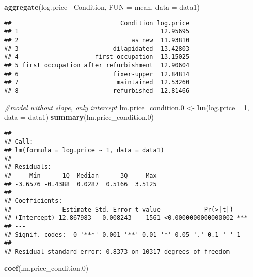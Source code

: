 \documentclass[
]{article}
\newenvironment{Shaded}{\begin{snugshade}}{\end{snugshade}}
\newcommand{\CommentTok}[1]{\textcolor[rgb]{0.56,0.35,0.01}{\textit{#1}}}
\newcommand{\DataTypeTok}[1]{\textcolor[rgb]{0.13,0.29,0.53}{#1}}
\newcommand{\DecValTok}[1]{\textcolor[rgb]{0.00,0.00,0.81}{#1}}
\newcommand{\FloatTok}[1]{\textcolor[rgb]{0.00,0.00,0.81}{#1}}
\newcommand{\KeywordTok}[1]{\textcolor[rgb]{0.13,0.29,0.53}{\textbf{#1}}}
\newcommand{\NormalTok}[1]{#1}
\newcommand{\OperatorTok}[1]{\textcolor[rgb]{0.81,0.36,0.00}{\textbf{#1}}}
\newcommand{\StringTok}[1]{\textcolor[rgb]{0.31,0.60,0.02}{#1}}
\begin{document}
\begin{Shaded}
\begin{Highlighting}[]
\KeywordTok{aggregate}\NormalTok{(log.price }\OperatorTok{~}\NormalTok{Condition, }
          \DataTypeTok{FUN =}\NormalTok{ mean, }\DataTypeTok{data =}\NormalTok{ data1)}
\end{Highlighting}
\end{Shaded}

\begin{verbatim}
##                              Condition log.price
## 1                                       12.95695
## 2                               as new  11.93810
## 3                          dilapidated  13.42803
## 4                     first occupation  13.15025
## 5 first occupation after refurbishment  12.90604
## 6                          fixer-upper  12.84814
## 7                           maintained  12.53260
## 8                          refurbished  12.81466
\end{verbatim}

\begin{Shaded}
\begin{Highlighting}[]
\CommentTok{#model without slope, only intercept}
\NormalTok{lm.price_condition}\FloatTok{.0}\NormalTok{ <-}\StringTok{ }\KeywordTok{lm}\NormalTok{(log.price }\OperatorTok{~}\StringTok{ }\DecValTok{1}\NormalTok{, }\DataTypeTok{data =}\NormalTok{ data1)}
\KeywordTok{summary}\NormalTok{(lm.price_condition}\FloatTok{.0}\NormalTok{)}
\end{Highlighting}
\end{Shaded}

\begin{verbatim}
## 
## Call:
## lm(formula = log.price ~ 1, data = data1)
## 
## Residuals:
##     Min      1Q  Median      3Q     Max 
## -3.6576 -0.4388  0.0287  0.5166  3.5125 
## 
## Coefficients:
##              Estimate Std. Error t value            Pr(>|t|)    
## (Intercept) 12.867983   0.008243    1561 <0.0000000000000002 ***
## ---
## Signif. codes:  0 '***' 0.001 '**' 0.01 '*' 0.05 '.' 0.1 ' ' 1
## 
## Residual standard error: 0.8373 on 10317 degrees of freedom
\end{verbatim}

\begin{Shaded}
\begin{Highlighting}[]
\KeywordTok{coef}\NormalTok{(lm.price_condition}\FloatTok{.0}\NormalTok{)}
\end{Highlighting}
\end{Shaded}
\end{document}
